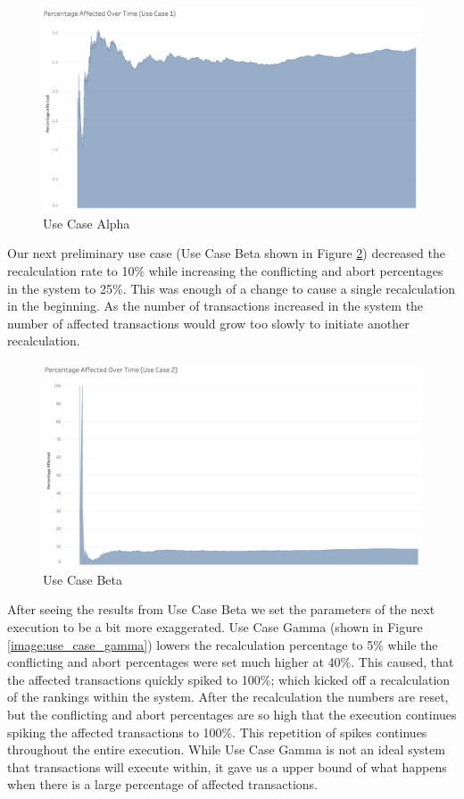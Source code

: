 \begin{figure}
\centering
\includegraphics[scale=0.35]{images/UseCase1.png}
\caption{Use Case Alpha}
\label{image:use_case_alpha}
\end{figure}

Our next preliminary use case (Use Case Beta shown in Figure \ref{image:use_case_beta}) decreased the recalculation rate to 10\% while increasing the conflicting and abort percentages in the system to 25\%. This was enough of a change to cause a single recalculation in the beginning. As the number of transactions increased in the system the number of affected transactions would grow too slowly to initiate another recalculation.

\begin{figure}
\centering
\includegraphics[scale=0.35]{images/UseCase2.png}
\caption{Use Case Beta}
\label{image:use_case_beta}
\end{figure}

After seeing the results from Use Case Beta we set the parameters of the next execution to be a bit more exaggerated. Use Case Gamma (shown in Figure \ref{image:use_case_gamma}) lowers the recalculation percentage to 5\% while the conflicting and abort percentages were set much higher at 40\%. This caused, that the affected transactions quickly spiked to 100\%; which kicked off a recalculation of the rankings within the system. After the recalculation the numbers are reset, but the conflicting and abort percentages are so high that the execution continues spiking the affected transactions to 100\%. This repetition of spikes continues throughout the entire execution. While Use Case Gamma is not an ideal system that transactions will execute within, it gave us a upper bound of what happens when there is a large percentage of affected transactions.

